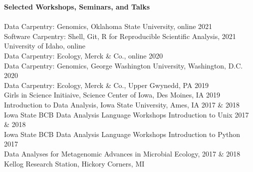 \vspace{0.5cm}
{\Large \textbf{Selected Workshops, Seminars, and Talks}}\\[-0.4cm]
\makebox[\linewidth]{\rule{1.0\textwidth}{0.4pt}}\\
\vspace{.05cm}
    Data Carpentry: Genomics, Oklahoma State University, online \hfill 2021 \\[-0.1cm]
    Software Carpentry: Shell, Git, R for Reproducible Scientific Analysis, \hfill 2021 \\[-0.1cm]
    \tab University of Idaho, online \\[-0.1cm]
    Data Carpentry: Ecology, Merck \& Co., online \hfill 2020 \\[-0.1cm]
    Data Carpentry: Genomics, George Washington University, Washington, D.C. \hfill 2020 \\[-0.1cm]
    Data Carpentry: Ecology, Merck \& Co., Upper Gwynedd, PA \hfill 2019 \\[-0.1cm]
    Girls in Science Initiaive, Science Center of Iowa, Des Moines, IA \hfill 2019 \\[-0.1cm]
    Introduction to Data Analysis, Iowa State University, Ames, IA \hfill 2017 \& 2018 \\[-0.1cm]
    Iowa State BCB Data Analysis Language Workshops Introduction to Unix \hfill 2017 \& 2018 \\[-0.1cm]
    Iowa State BCB Data Analysis Language Workshops Introduction to Python \hfill 2017 \\[-0.1cm]
    Data Analyses for Metagenomic Advances in Microbial Ecology, \hfill 2017 \& 2018 \\[-0.1cm]
    \tab Kellog Research Station, Hickory Corners, MI \\[-0.1cm]
    

